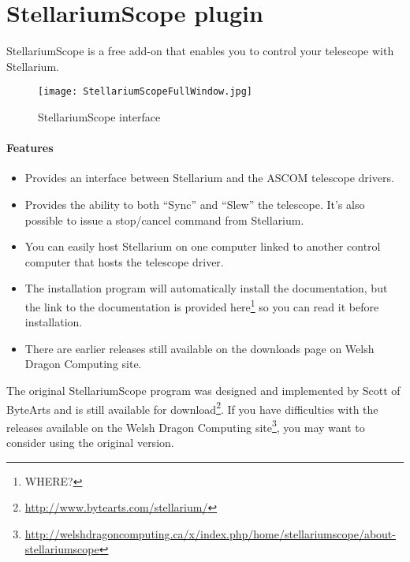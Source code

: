 


\newpage
\section{StellariumScope plugin}
\label{sec:plugins:StellariumScope}
StellariumScope is a free add-on that enables you to control your telescope with Stellarium. 

\begin{figure}[htp]
\begin{center}
\texttt{[image: StellariumScopeFullWindow.jpg]}
\end{center}
\label{fig:StellariumScopeFullWindow}
\caption{StellariumScope interface}
\end{figure}


\paragraph{Features}
\begin{itemize}
\item Provides an interface between Stellarium and the ASCOM telescope drivers.
\item Provides the ability to both ``Sync'' and ``Slew'' the
  telescope. It's also possible to issue a stop/cancel command from
  Stellarium.
\item You can easily host Stellarium on one computer linked to another
  control computer that hosts the telescope driver.
\item The installation program will automatically install the
  documentation, but the link to the documentation is provided
  here\footnote{WHERE?} so you can read it before installation.
\item There are earlier releases still available on the downloads page on
  Welsh Dragon Computing site.
\end{itemize}

The original StellariumScope program was designed and implemented by
Scott of ByteArts and is still available for
download\footnote{\url{http://www.bytearts.com/stellarium/}}. If you
have difficulties with the releases available on the Welsh Dragon
Computing
site\footnote{\url{http://welshdragoncomputing.ca/x/index.php/home/stellariumscope/about-stellariumscope}},
you may want to consider using the original version.



